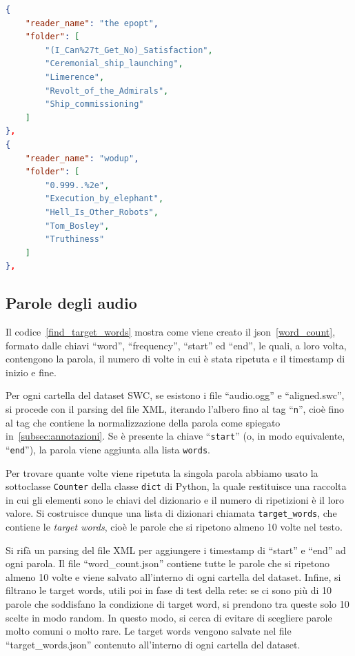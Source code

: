 \documentclass[12pt,a4paper,titlepage]{article}
\begin{document}
\begin{lstlisting}[language=json,firstnumber=1, caption=Formato del file readers\_paths.json, label=JSON_lettori,captionpos=b]
{
	"reader_name": "the epopt",
	"folder": [
		"(I_Can%27t_Get_No)_Satisfaction",
		"Ceremonial_ship_launching",
		"Limerence",
		"Revolt_of_the_Admirals",
		"Ship_commissioning"
	]
},
{
	"reader_name": "wodup",
	"folder": [
		"0.999..%2e",
		"Execution_by_elephant",
		"Hell_Is_Other_Robots",
		"Tom_Bosley",
		"Truthiness"
	]
},
\end{lstlisting}

\subsection{Parole degli audio}
\label{subsec:parole}
Il codice~\ref{find_target_words} mostra come viene creato il json~\ref{word_count}, formato dalle chiavi ``word'', ``frequency'', ``start'' ed ``end'', le quali, a loro volta, contengono la parola, il numero di volte in cui è stata ripetuta e il timestamp di inizio e fine.

Per ogni cartella del dataset SWC, se esistono i file ``audio.ogg'' e ``aligned.swc'', si procede con il parsing del file XML, iterando l'albero fino al tag  ``\texttt{n}'', cioè fino al tag che contiene la normalizzazione della parola come spiegato in~\ref{subsec:annotazioni}. Se è presente la chiave ``\texttt{start}'' (o, in modo equivalente, ``\texttt{end}''), la parola viene aggiunta alla lista \texttt{words}.

Per trovare quante volte viene ripetuta la singola parola abbiamo usato la sottoclasse \texttt{Counter} della classe \texttt{dict} di Python, la quale restituisce una raccolta in cui gli elementi sono le chiavi del dizionario e il numero di ripetizioni è il loro valore. Si costruisce dunque una lista di dizionari chiamata \texttt{target\_words}, che contiene le \emph{target words}, cioè le parole che si ripetono almeno 10 volte nel testo.~\cite{Salamon:Few-Shot}

Si rifà un parsing del file XML per aggiungere i timestamp di ``start'' e ``end'' ad ogni parola. Il file ``word\_count.json'' contiene tutte le parole che si ripetono almeno 10 volte e viene salvato all'interno di ogni cartella del dataset. Infine, si filtrano le target words, utili poi in fase di test della rete: se ci sono più di 10 parole che soddisfano la condizione di target word, si prendono tra queste solo 10 scelte in modo random. In questo modo, si cerca di evitare di scegliere parole molto comuni o molto rare. Le target words vengono salvate nel file ``target\_words.json'' contenuto all'interno di ogni cartella del dataset. 
\end{document}
